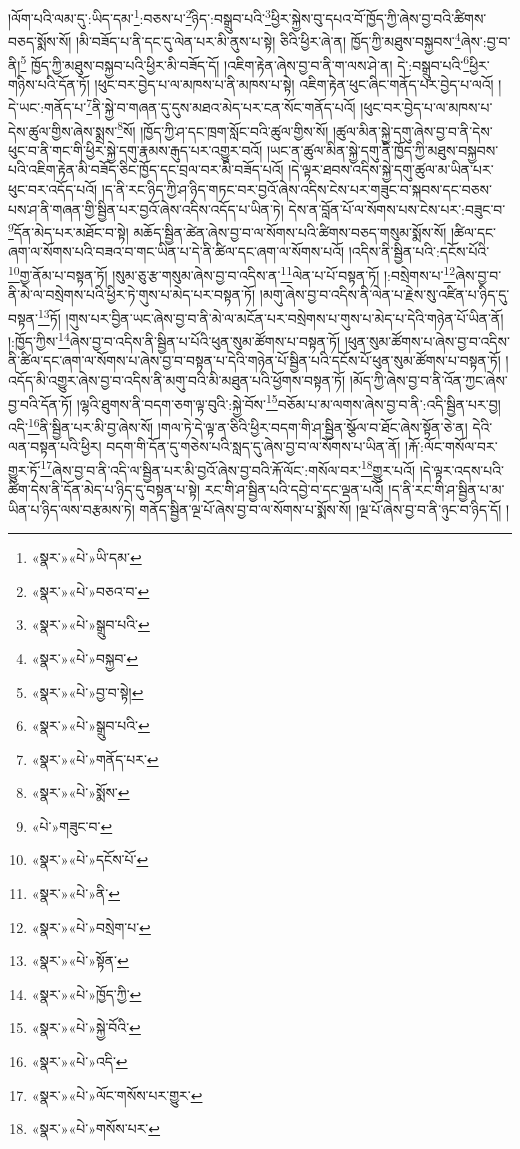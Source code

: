 །ལོག་པའི་ལམ་དུ་:ཡིད་དམ་\footnote{«སྣར་»«པེ་»ཡི་དམ་}:བཅས་པ་\footnote{«སྣར་»«པེ་»བཅའ་བ་}ཉིད་:བསྒྲུབ་པའི་\footnote{«སྣར་»«པེ་»སྒྲུབ་པའི་}ཕྱིར་སྐྱེས་བུ་དཔའ་བོ་ཁྱོད་ཀྱི་ཞེས་བྱ་བའི་ཚིགས་བཅད་སྨོས་སོ། །མི་བཟོད་པ་ནི་དང་དུ་ལེན་པར་མི་ནུས་པ་སྟེ། ཅིའི་ཕྱིར་ཞེ་ན། ཁྱོད་ཀྱི་མཐུས་བསྐྱབས་\footnote{«སྣར་»«པེ་»བསྐྱབ་}ཞེས་:བྱ་བ་ནི།\footnote{«སྣར་»«པེ་»བྱ་བ་སྟེ།} ཁྱོད་ཀྱི་མཐུས་བསྐྱབ་པའི་ཕྱིར་མི་བཟོད་དོ། །འཇིག་རྟེན་ཞེས་བྱ་བ་ནི་ག་ལས་ཤེ་ན། དེ་:བསྒྲུབ་པའི་\footnote{«སྣར་»«པེ་»སྒྲུབ་པའི་}ཕྱིར་གཉིས་པའི་དོན་ཏོ། །ཕུང་བར་བྱེད་པ་ལ་མཁས་པ་ནི་མཁས་པ་སྟེ། འཇིག་རྟེན་ཕུང་ཞིང་གནོད་པར་བྱེད་པ་ལའོ། །དེ་ཡང་:གནོད་པ་\footnote{«སྣར་»«པེ་»གནོད་པར་}ནི་སྐྱེ་བ་གཞན་དུ་དུས་མཐའ་མེད་པར་ངན་སོང་གནོད་པའོ། །ཕུང་བར་བྱེད་པ་ལ་མཁས་པ་དེས་ཚུལ་གྱིས་ཞེས་སྨྲས་\footnote{«སྣར་»«པེ་»སྨོས་}སོ། །ཁྱོད་ཀྱི་ཤ་དང་ཁྲག་སློང་བའི་ཚུལ་གྱིས་སོ། །ཚུལ་མིན་སྐྱེ་དགུ་ཞེས་བྱ་བ་ནི་དེས་ཕུང་བ་ནི་གང་གི་ཕྱིར་སྐྱེ་དགུ་རྣམས་རྒུད་པར་འགྱུར་བའོ། །ཡང་ན་ཚུལ་མིན་སྐྱེ་དགུ་ནི་ཁྱོད་ཀྱི་མཐུས་བསྐྱབས་པའི་འཇིག་རྟེན་མི་བཟོད་ཅིང་ཁྱོད་དང་བྲལ་བར་མི་བཟོད་པའོ། །དེ་ལྟར་ཐབས་འདིས་སྐྱེ་དགུ་ཚུལ་མ་ཡིན་པར་ཕུང་བར་འདོད་པའོ། །ད་ནི་རང་ཉིད་ཀྱི་ཤ་ཉིད་གཏང་བར་བྱའོ་ཞེས་འདིས་ངེས་པར་གཟུང་བ་སྐབས་དང་བཅས་པས་ཤ་ནི་གཞན་གྱི་སྦྱིན་པར་བྱའོ་ཞེས་འདིས་འདོད་པ་ཡིན་ཏེ། དེས་ན་བློན་པོ་ལ་སོགས་པས་ངེས་པར་:བཟུང་བ་\footnote{«པེ་»གཟུང་བ་}དོན་མེད་པར་མཐོང་བ་སྟེ། མཆོད་སྦྱིན་ཚེན་ཞེས་བྱ་བ་ལ་སོགས་པའི་ཚིགས་བཅད་གསུམ་སྨོས་སོ། །ཚིལ་དང་ཞག་ལ་སོགས་པའི་བཟའ་བ་གང་ཡིན་པ་དེ་ནི་ཚིལ་དང་ཞག་ལ་སོགས་པའོ། །འདིས་ནི་སྦྱིན་པའི་:དངོས་པོའི་\footnote{«སྣར་»«པེ་»དངོས་པོ་}གྱ་ནོམ་པ་བསྟན་ཏོ། །སུམ་ཅུ་རྩ་གསུམ་ཞེས་བྱ་བ་འདིས་ན་\footnote{«སྣར་»«པེ་»ནི་}ལེན་པ་པོ་བསྟན་ཏོ། །:བསྲེགས་པ་\footnote{«སྣར་»«པེ་»བསྲེག་པ་}ཞེས་བྱ་བ་ནི་མེ་ལ་བསྲེགས་པའི་ཕྱིར་ཏེ་གུས་པ་མེད་པར་བསྟན་ཏོ། །མགུ་ཞེས་བྱ་བ་འདིས་ནི་ལེན་པ་རྗེས་སུ་འཛིན་པ་ཉིད་དུ་བསྟན་\footnote{«སྣར་»«པེ་»སྟོན་}ཏོ། །གུས་པར་བྱིན་ཡང་ཞེས་བྱ་བ་ནི་མེ་ལ་མངོན་པར་བསྲེགས་པ་གུས་པ་མེད་པ་དེའི་གཉེན་པོ་ཡིན་ནོ། །:ཁྱོད་ཀྱིས་\footnote{«སྣར་»«པེ་»ཁྱོད་ཀྱི་}ཞེས་བྱ་བ་འདིས་ནི་སྦྱིན་པ་པོའི་ཕུན་སུམ་ཚོགས་པ་བསྟན་ཏོ། །ཕུན་སུམ་ཚོགས་པ་ཞེས་བྱ་བ་འདིས་ནི་ཚིལ་དང་ཞག་ལ་སོགས་པ་ཞེས་བྱ་བ་བསྟན་པ་དེའི་གཉེན་པོ་སྦྱིན་པའི་དངོས་པོ་ཕུན་སུམ་ཚོགས་པ་བསྟན་ཏོ། །འདོད་མི་འགྱུར་ཞེས་བྱ་བ་འདིས་ནི་མགུ་བའི་མི་མཐུན་པའི་ཕྱོགས་བསྟན་ཏོ། །མོད་ཀྱི་ཞེས་བྱ་བ་ནི་འོན་ཀྱང་ཞེས་བྱ་བའི་དོན་ཏོ། །ལྷའི་ཐུགས་ནི་བདག་ཅག་ལྟ་བུའི་:སྐྱེ་བོས་\footnote{«སྣར་»«པེ་»སྐྱེ་བོའི་}བཅོམ་པ་མ་ལགས་ཞེས་བྱ་བ་ནི་:འདི་སྦྱིན་པར་བྱ། འདི་\footnote{«སྣར་»«པེ་»འདི་}ནི་སྦྱིན་པར་མི་བྱ་ཞེས་སོ། །གལ་ཏེ་དེ་ལྟ་ན་ཅིའི་ཕྱིར་བདག་གི་ཤ་སྦྱིན་སྩོལ་བ་ཐོང་ཞེས་སྟོན་ཅེ་ན། དེའི་ལན་བསྟན་པའི་ཕྱིར། བདག་གི་དོན་དུ་གཅེས་པའི་སླད་དུ་ཞེས་བྱ་བ་ལ་སོགས་པ་ཡིན་ནོ། །རྐོ་:ལོང་གསོལ་བར་གྱུར་ཏོ་\footnote{«སྣར་»«པེ་»ལོང་གསོས་པར་གྱུར་}ཞེས་བྱ་བ་ནི་འདི་ལ་སྦྱིན་པར་མི་བྱའོ་ཞེས་བྱ་བའི་རྐོ་ལོང་:གསོལ་བར་\footnote{«སྣར་»«པེ་»གསོས་པར་}གྱུར་པའོ། །དེ་ལྟར་འདས་པའི་ཚིག་དེས་ནི་དོན་མེད་པ་ཉིད་དུ་བསྟན་པ་སྟེ། རང་གི་ཤ་སྦྱིན་པའི་དབྱེ་བ་དང་ལྡན་པའོ། །ད་ནི་རང་གི་ཤ་སྦྱིན་པ་མ་ཡིན་པ་ཉིད་ལས་བརྩམས་ཏེ། གནོད་སྦྱིན་ལྔ་པོ་ཞེས་བྱ་བ་ལ་སོགས་པ་སྨོས་སོ། །ལྔ་པོ་ཞེས་བྱ་བ་ནི་ཉུང་བ་ཉིད་དོ། །
